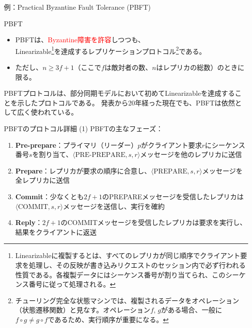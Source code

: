 \documentclass[aspectratio=169,10pt]{beamer}
\newenvironment{proofblock}[1][]
{\begin{block}{#1}\vspace{0.5em}}
{\vspace{0.5em}\end{block}}
\begin{document}
\begin{frame}{例：Practical Byzantine Fault Tolerance (PBFT)}
\begin{proofblock}[PBFT]
\begin{itemize}
    \item PBFTは、\textcolor{red}{Byzantine障害を許容}しつつも、\\Linearizable\footnote{Linearizableに複製するとは、すべてのレプリカが同じ順序でクライアント要求を処理し、その反映が書き込みリクエストのセッション内で必ず行われる性質である。各複製データにはシーケンス番号が割り当てられ、このシーケンス番号に従って処理される。}を達成するレプリケーションプロトコル\footnote{チューリング完全な状態マシンでは、複製されるデータをオペレーション（状態遷移関数）と見なす。オペレーション$f$, $g$がある場合、一般に$f \circ g \neq g \circ f$であるため、実行順序が重要になる。}である。
    \item ただし、$n \geq 3f+1$（ここで$f$は敵対者の数、$n$はレプリカの総数）のときに限る。
\end{itemize}
\end{proofblock}

PBFTプロトコルは、部分同期モデルにおいて初めてLinearizableを達成することを示したプロトコルである。
発表から20年経った現在でも、PBFTは依然として広く使われている。


\end{frame}

\begin{frame}{PBFTのプロトコル詳細 (1)}
PBFTの主なフェーズ：
\vspace{0.5em}
\begin{enumerate}
    \item \textbf{Pre-prepare}：プライマリ（リーダー）$p$がクライアント要求$r$にシーケンス番号$s$を割り当て、$\langle \text{PRE-PREPARE}, s, r \rangle$メッセージを他のレプリカに送信
    
    \item \textbf{Prepare}：レプリカが要求の順序に合意し、$\langle \text{PREPARE}, s, r \rangle$メッセージを全レプリカに送信
    
    \item \textbf{Commit}：少なくとも$2f+1$のPREPAREメッセージを受信したレプリカは$\langle \text{COMMIT}, s, r \rangle$メッセージを送信し、実行を確約
    
    \item \textbf{Reply}：$2f+1$のCOMMITメッセージを受信したレプリカは要求を実行し、結果をクライアントに返送
\end{enumerate}
\end{frame}
\end{document}
